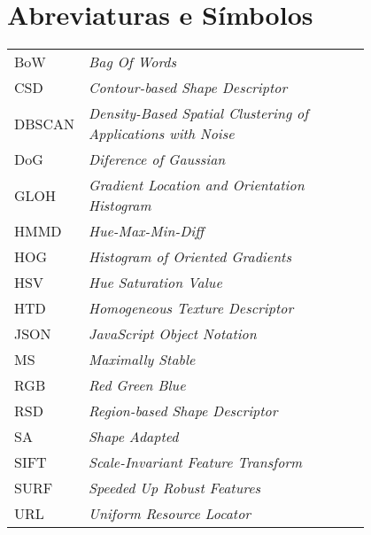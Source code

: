 \chapter*{Abreviaturas e Símbolos}

\begin{flushleft}
\begin{tabular}{l p{0.8\linewidth}}
BoW		 & \textit{Bag Of Words}\\
CSD 	 & \textit{Contour-based Shape Descriptor}\\
DBSCAN   & \textit{Density-Based Spatial Clustering of Applications with Noise}\\
DoG      & \textit{Diference of Gaussian}\\
GLOH     & \textit{Gradient Location and Orientation Histogram}\\
HMMD     & \textit{Hue-Max-Min-Diff}\\
HOG      & \textit{Histogram of Oriented Gradients}\\
HSV 	 & \textit{Hue Saturation Value}\\
HTD      & \textit{Homogeneous Texture Descriptor} \\
JSON	 & \textit{JavaScript Object Notation}\\
MS		 & \textit{Maximally Stable}\\
RGB 	 & \textit{Red Green Blue}\\
RSD 	 & \textit{Region-based Shape Descriptor}\\
SA		 & \textit{Shape Adapted}\\
SIFT     & \textit{Scale-Invariant Feature Transform}\\
SURF     & \textit{Speeded Up Robust Features}\\
URL		 & \textit{Uniform Resource Locator}



\end{tabular}
\end{flushleft}

